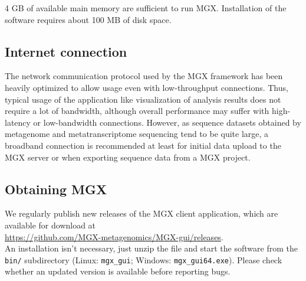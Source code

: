 4 GB of available main memory are sufficient to run MGX. Installation of the
software requires about 100 MB of disk space.

\subsection{Internet connection}

The network communication protocol used by the MGX framework has been heavily optimized to
allow usage even with low-throughput connections. Thus, typical usage of the application
like visualization of analysis results does not require a lot of bandwidth, although
overall performance may suffer with high-latency or low-bandwidth connections. However, as
sequence datasets obtained by metagenome and metatranscriptome sequencing tend to be quite large, a broadband 
connection is recommended at least for initial data upload to the MGX server or when exporting
sequence data from a MGX project.

\subsection{Obtaining MGX}

We regularly publish new releases of the MGX client application, which are
available for download at\\

    \url{https://github.com/MGX-metagenomics/MGX-gui/releases}.\\

\noindent
An installation isn't necessary, just unzip the file and start the software
from the \texttt{bin/} subdirectory (Linux: \texttt{mgx\_gui}; Windows: \texttt{mgx\_gui64.exe}). Please check whether an updated version
is available before reporting bugs.

